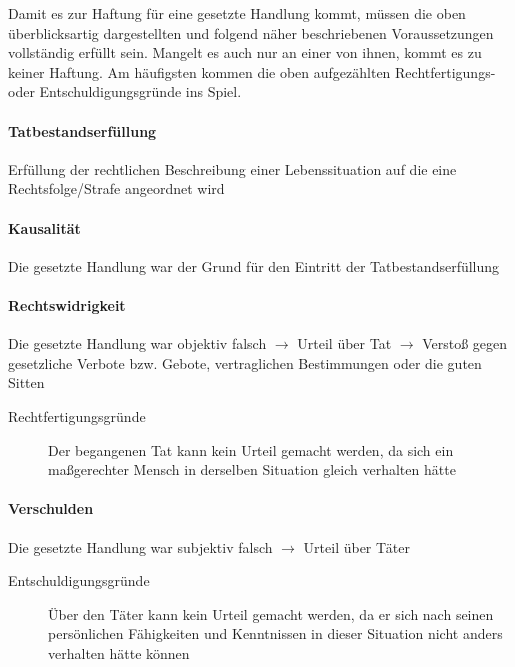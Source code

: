 Damit es zur Haftung f\"ur eine gesetzte Handlung kommt, m\"ussen die
oben \"uberblicksartig dargestellten und folgend näher beschriebenen
Voraussetzungen vollständig erf\"ullt sein. Mangelt es auch nur an
einer von ihnen, kommt es zu keiner Haftung. Am häufigsten kommen die
oben aufgezählten Rechtfertigungs- oder Entschuldigungsgr\"unde ins
Spiel.

\paragraph{Tatbestandserf\"ullung }

Erf\"ullung der rechtlichen Beschreibung einer Lebenssituation auf die
eine Rechtsfolge/Strafe angeordnet wird

\paragraph*{Kausalität}

{\mdseries
Die gesetzte Handlung war der Grund f\"ur den Eintritt der
Tatbestandserf\"ullung}

\paragraph*{Rechtswidrigkeit}

Die gesetzte Handlung war objektiv falsch ${\rightarrow}$ Urteil \"uber
Tat ${\rightarrow}$ Versto{\ss} gegen gesetzliche Verbote bzw. Gebote,
vertraglichen Bestimmungen oder die guten Sitten 


\begin{description}
    \item[Rechtfertigungsgr\"unde]  Der begangenen Tat kann kein Urteil gemacht werden, da sich ein
ma{\ss}gerechter Mensch in  derselben Situation gleich verhalten
hätte
\end{description}


\paragraph*{Verschulden}

Die gesetzte Handlung war subjektiv falsch ${\rightarrow}$ Urteil \"uber
Täter

\begin{description}
    \item[Entschuldigungsgr\"unde] \"Uber den Täter kann kein Urteil gemacht werden, da er sich nach
seinen pers\"onlichen   Fähigkeiten und Kenntnissen in dieser
Situation nicht anders verhalten hätte k\"onnen
\end{description}



